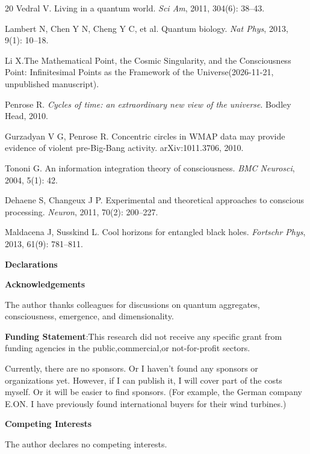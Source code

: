 \documentclass[11pt,a4paper]{article}
\begin{document}
\begin{thebibliography}{20}
Vedral V. Living in a quantum world. \textit{Sci Am}, 2011, 304(6): 38--43.

Lambert N, Chen Y N, Cheng Y C, et al. Quantum biology. \textit{Nat Phys}, 2013, 9(1): 10--18.

Li X.The Mathematical Point, the Cosmic Singularity, and
the Consciousness Point:
Infinitesimal Points as the Framework of the Universe(2026-11-21, unpublished manuscript).

Penrose R. \textit{Cycles of time: an extraordinary new view of the universe}. Bodley Head, 2010.

Gurzadyan V G, Penrose R. Concentric circles in WMAP data may provide evidence of violent pre-Big-Bang activity. arXiv:1011.3706, 2010.

Tononi G. An information integration theory of consciousness. \textit{BMC Neurosci}, 2004, 5(1): 42.

Dehaene S, Changeux J P. Experimental and theoretical approaches to conscious processing. \textit{Neuron}, 2011, 70(2): 200--227.

Maldacena J, Susskind L. Cool horizons for entangled black holes. \textit{Fortschr Phys}, 2013, 61(9): 781--811.


\textbf{\textbf{Declarations}}

  
  
  \textbf{\textbf{Acknowledgements}}

The author thanks colleagues for discussions on quantum aggregates, consciousness, emergence, and dimensionality. 

 \textbf{\textbf{Funding Statement}}:This research did not receive any specific grant from funding agencies in the public,commercial,or not-for-profit sectors.

Currently, there are no sponsors. Or I haven't found any sponsors or organizations yet. However, if I can publish it, I will cover part of the costs myself. Or it will be easier to find sponsors. (For example, the German company E.ON. I have previously found international buyers for their wind turbines.)

 \textbf{\textbf{Competing Interests}}

The author declares no competing interests.


\end{thebibliography}
\end{document}
